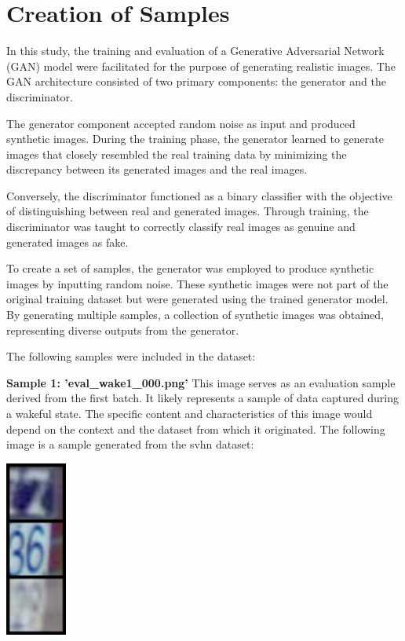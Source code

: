 \documentclass{midl} %
\begin{document}
\section{Creation of Samples}

In this study, the training and evaluation of a Generative Adversarial Network (GAN) model were facilitated for the purpose of generating realistic images. The GAN architecture consisted of two primary components: the generator and the discriminator.

The generator component accepted random noise as input and produced synthetic images. During the training phase, the generator learned to generate images that closely resembled the real training data by minimizing the discrepancy between its generated images and the real images.

Conversely, the discriminator functioned as a binary classifier with the objective of distinguishing between real and generated images. Through training, the discriminator was taught to correctly classify real images as genuine and generated images as fake.

To create a set of samples, the generator was employed to produce synthetic images by inputting random noise. These synthetic images were not part of the original training dataset but were generated using the trained generator model. By generating multiple samples, a collection of synthetic images was obtained, representing diverse outputs from the generator.


The following samples were included in the dataset:



\textbf{Sample 1: 'eval\_wake1\_000.png'}
This image serves as an evaluation sample derived from the first batch. It likely represents a sample of data captured during a wakeful state. The specific content and characteristics of this image would depend on the context and the dataset from which it originated.
The following image is a sample generated from the svhn dataset:

\begin{center}
    \includegraphics[width=0.15\textwidth]{eval_wake1_000.png}
\end{center}
\end{document}
